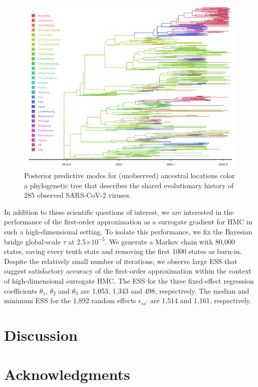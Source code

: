 \documentclass[12pt]{article} %
\begin{document}
\begin{figure}[!t]
	\centering
	\includegraphics[width=0.8\linewidth]{summary.tree.pdf}
	\vspace{-1em}
	\caption{Posterior predictive modes for (unobserved) ancestral locations color a phylogenetic tree that describes the shared evolutionary history of 285 observed SARS-CoV-2 viruses.}\label{fig:tree}
\end{figure}

In addition to these scientific questions of interest, we are interested in the performance of the first-order approximation as a surrogate gradient for HMC in such a high-dimensional setting. To isolate this performance, we fix the Bayesian bridge global-scale $\tau$ at 2.5$\times10^{-5}$.  We generate a Markov chain with 80,000 states, saving every tenth state and removing the first 1000 states as burn-in.  Despite the relatively small number of iterations, we observe large ESS that suggest satisfactory accuracy of the first-order approximation within the context of high-dimensional surrogate HMC.  The ESS for the three fixed-effect regression coefficients $\theta_1$, $\theta_2$ and $\theta_3$ are 1,053, 1,343 and 498, respectively.  The median and minimum ESS for the 1,892 random effects $\epsilon_{ss'}$ are 1,514 and 1,161, respectively.


\section{Discussion}


\section*{Acknowledgments}
\end{document}
